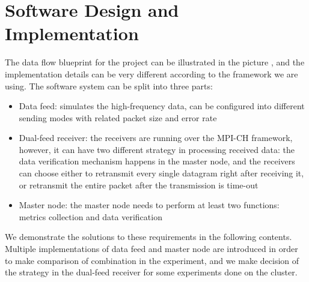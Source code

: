 \documentclass[11pt,openright,a4paper]{report}
\begin{document}
\section{Software Design and Implementation}
The data flow blueprint for the project can be illustrated in the picture \cite{fig:LogicDesign}, and the implementation details can be very different according to the framework we are using. The software system can be split into three parts:
\begin{itemize}
	\item Data feed: simulates the high-frequency data, can be configured into different sending modes with related packet size and error rate
	\item Dual-feed receiver: the receivers are running over the MPI-CH framework, however, it can have two different strategy in processing received data: the data verification mechanism happens in the master node, and the receivers can choose either to retransmit every single datagram right after receiving it, or retransmit the entire packet after the transmission is time-out
	\item Master node: the master node needs to perform at least two functions: metrics collection and data verification
\end{itemize}
We demonstrate the solutions to these requirements in the following contents. Multiple implementations of data feed and master node are introduced in order to make comparison of combination in the experiment, and we make decision of the strategy in the dual-feed receiver for some experiments done on the cluster. 
\end{document}
